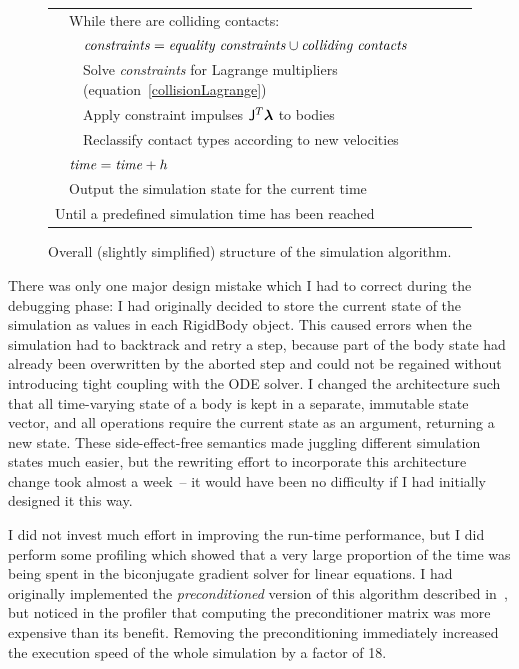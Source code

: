 \begin{figure}
\begin{tabular}{|l|l|l|l|@{}l}
    &\multicolumn{3}{|l|}{While there are colliding contacts:}\\\cline{3-4}
        &&\multicolumn{2}{|l|}{$\mbox{\textit{constraints}} = \mbox{\textit{equality constraints}}
        \cup \mbox{\textit{colliding contacts}}$}\\\cline{3-4}
        &&\multicolumn{2}{|l|}{Solve \textit{constraints} for Lagrange multipliers
        (equation~\ref{collisionLagrange})}&
        \curly{\ref{collidingContact}}{\spx\spx\spx\spx\spx}\\\cline{3-4}
        &&\multicolumn{2}{|l|}{Apply constraint impulses $\m{J}^T\ve{\lambda}$ to bodies}\\\cline{3-4}
        &&\multicolumn{2}{|l|}{Reclassify contact types according to new velocities}\\\cline{2-4}
    &\multicolumn{3}{|l|}{$\mbox{\textit{time}} = \mbox{\textit{time}} + h$}\\\cline{2-4}
    &\multicolumn{3}{|l|}{Output the simulation state for the current time}\\\cline{2-4}
\multicolumn{4}{|l|}{Until a predefined simulation time has been reached}\\\cline{1-4}
\end{tabular}
\caption{Overall (slightly simplified) structure of the simulation algorithm.\label{flowchart}}
\end{figure}

There was only one major design mistake which I had to correct during the debugging phase: I had
originally decided to store the current state of the simulation as values in each
\textsf{RigidBody} object. This caused errors when the simulation had to backtrack and retry a
step, because part of the body state had already been overwritten by the aborted step and could
not be regained without introducing tight coupling with the ODE solver. I changed the architecture
such that all time-varying state of a body is kept in a separate, immutable state vector, and all
operations require the current state as an argument, returning a new state. These side-effect-free
semantics made juggling different simulation states much easier, but the rewriting effort
to incorporate this architecture change took almost a week~-- it would have been no difficulty
if I had initially designed it this way.

I did not invest much effort in improving the run-time performance, but I did perform some
profiling which showed that a very large proportion of the time was being spent in the biconjugate
gradient solver for linear equations. I had originally implemented the \emph{preconditioned}
version of this algorithm described in~\cite{NRinC}, but noticed in the profiler that computing
the preconditioner matrix was more expensive than its benefit. Removing the preconditioning
immediately increased the execution speed of the whole simulation by a factor of 18.


